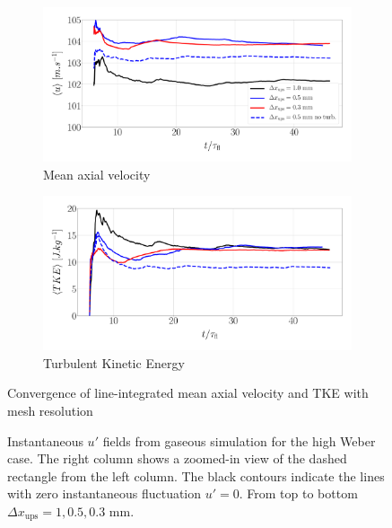 \begin{figure}[ht]
\centering
\begin{subfigure}[b]{0.45\textwidth}
	\centering
   \includegraphics[scale=0.125]{./part2_developments/figures_ch5_resolved_JICF/results_ics_mesh_convergence_line_averages/U_MEAN.pdf}
   \vspace*{-0.30in}
   \caption{Mean axial velocity}
\end{subfigure}
\hfill
\begin{subfigure}[b]{0.45\textwidth}
	\centering
   \includegraphics[scale=0.125]{./part2_developments/figures_ch5_resolved_JICF/results_ics_mesh_convergence_line_averages/TKE.pdf}
   \vspace*{-0.30in}
   \caption{Turbulent Kinetic Energy}
\end{subfigure}
\caption{Convergence of line-integrated mean axial velocity and TKE with mesh resolution}
\label{fig:mesh_convergence_line_averages}
\end{figure}

\begin{figure}[ht]
\centering
{}
\caption[Instantaneous $u'$ fields from gaseous simulation for the high Weber case]{Instantaneous $u'$ fields from gaseous simulation for the high Weber case. The right column shows a zoomed-in view of the dashed rectangle from the left column. The black contours indicate the lines with zero instantaneous fluctuation $u' = 0$. From top to bottom $\Delta x_\mathrm{ups} = 1, 0.5, 0.3$ mm.}
\label{fig:ics_mesh_independency_study_up_fields}
\end{figure}



